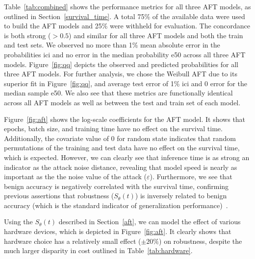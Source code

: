 \documentclass[sn-mathphys-num]{sn-jnl}%
\begin{document}
Table~\ref{tab:combined} shows the performance metrics for all three AFT models, as outlined in Section~\ref{survival_time}. A total 75\% of the available data were used to build the AFT models and 25\% were withheld for evaluation. The concordance is both strong ($>0.5$) and similar for all three AFT models and both the train and test sets. We observed no more than 1\% mean absolute error in the probabilities \acrshort{ici} and no error in the median probability \acrshort{e50} across all three AFT models. Figure~\ref{fig:qq} depicts the observed and predicted probabilities for all three AFT models. For further analysis, we chose the Weibull AFT due to its superior fit in Figure~\ref{fig:qq}, and average test error of 1\% \acrshort{ici} and 0 error for the median sample \acrshort{e50}. We also see that these metrics are  functionally identical across all AFT models as well as between the test and train set of each model. 

Figure~\ref{fig:aft} shows the log-scale coefficients for the AFT model. It shows that epochs, batch size, and training time have no effect on the survival time. 
Additionally, the covariate value of 0 for random state indicates that random permutations of the training and test data have no effect on the survival time, which is expected. 
However, we can clearly see that inference time  is as strong an indicator as the attack noise distance, revealing that model speed is nearly as important as the the noise value of the attack ($\varepsilon$). 
Furthermore, we see that benign accuracy is negatively correlated with the survival time, confirming previous assertions that robustness ($S_{\theta}(t)$) is inversely related to benign accuracy (which is the standard indicator of generalization performance)~\cite{carlini_towards_2017}.

Using the $S_{\theta}(t)$ described in Section~\ref{aft}, we can model the effect of various hardware devices, which is depicted in Figure~\ref{fig:aft}. 
It clearly shows that hardware choice has a relatively small effect ($\pm 20\%$) on robustness, despite the much larger disparity in cost outlined in Table~\ref{tab:hardware}.
\end{document}
